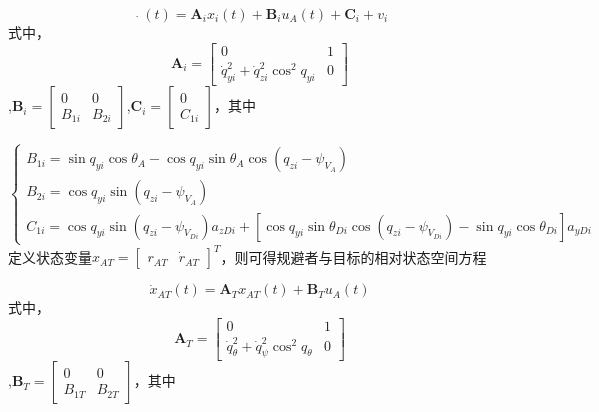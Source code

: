 \begin{equation}
\label{eq:12}
\mathop {{x_i}}\limits^. (t) = {{\mathbf{A}}_i}{x_i}(t) + {{\mathbf{B}}_i}{u_A}(t) + {{\mathbf{C}}_i} + {v_i}
\end{equation}
式中，\[{{\mathbf{A}}_i} = \left[ {\begin{array}{*{20}{c}}
  0&1 \\ 
  {\dot q_{yi}^2 + \dot q_{zi}^2{{\cos }^2}{q_{yi}}}&0 
\end{array}} \right]\],${{\mathbf{B}}_i} = \left[ {\begin{array}{*{20}{c}}
  0&0 \\ 
  {{B_{1i}}}&{{B_{2i}}} 
\end{array}} \right]$,${{\mathbf{C}}_i} = \left[ {\begin{array}{*{20}{c}}
  0 \\ 
  {{C_{1i}}} 
\end{array}} \right]$，其中

\begin{equation}
\label{eq:13}
\left\{ {\begin{array}{*{20}{l}}
  {{B_{1i}} = \sin {q_{yi}}\cos {\theta _A} - \cos {q_{yi}}\sin {\theta _A}\cos \left( {{q_{zi}} - {\psi _{{V_A}}}} \right)} \\ 
  {{B_{2i}} = \cos {q_{yi}}\sin \left( {{q_{zi}} - {\psi _{{V_A}}}} \right)} \\ 
  {{C_{1i}} = \cos {q_{yi}}\sin \left( {{q_{zi}} - {\psi _{{V_{Di}}}}} \right){a_{zDi}} + [\cos {q_{yi}}\sin {\theta _{Di}}\cos \left( {{q_{zi}} - {\psi _{{V_{Di}}}}} \right) - \sin {q_{yi}}\cos {\theta _{Di}}]{a_{yDi}}} 
\end{array}} \right.
\end{equation}
定义状态变量${x_{AT}} = {\left[ {\begin{array}{*{20}{c}}
  {{r_{AT}}}&{{{\dot r}_{AT}}} 
\end{array}} \right]^T}$，则可得规避者与目标的相对状态空间方程

\begin{equation}
\label{eq:14}
{\dot x_{AT}}(t) = {{\mathbf{A}}_T}{x_{AT}}(t) + {{\mathbf{B}}_T}{u_A}(t)
\end{equation}
式中，\[{{\mathbf{A}}_T} = \left[ {\begin{array}{*{20}{c}}
  0&1 \\ 
  {\dot q_\theta ^2 + \dot q_\psi ^2{{\cos }^2}{q_\theta }}&0 
\end{array}} \right]\],${{\mathbf{B}}_T} = \left[ {\begin{array}{*{20}{c}}
  0&0 \\ 
  {{B_{1T}}}&{{B_{2T}}} 
\end{array}} \right]$，其中


